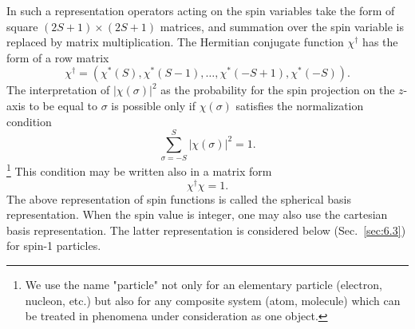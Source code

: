 In such a representation operators acting on the spin variables take the form of square $(2 S+1) \times(2 S+1)$ matrices, and summation over the spin variable is replaced by matrix multiplication. The Hermitian conjugate function $\chi^{\dagger}$ has the form of a row matrix
\begin{equation}
\chi^{\dagger}=\left(\chi^{*}(S), \chi^{*}(S-1), \ldots ,\chi^{*}(-S+1), \chi^{*}(-S)\right) . \label{eq:6:1:2}
\end{equation}
The interpretation of $|\chi(\sigma)|^{2}$ as the probability for the spin projection on the $z$-axis to be equal to $\sigma$ is possible only if $\chi(\sigma)$ satisfies the normalization condition
\begin{equation}
\sum_{\sigma=-S}^{S}|\chi(\sigma)|^{2}=1. \label{eq:6:1:3}
\end{equation}
\footnote{We use the name "particle" not only for an elementary particle (electron, nucleon, etc.) but also for any composite system (atom, molecule) which can be treated in phenomena under consideration as one object.}
This condition may be written also in a matrix form
\begin{equation}
\chi^{\dagger} \chi=1 . \label{eq:6:1:4}
\end{equation}
The above representation of spin functions is called the spherical basis representation. When the spin value is integer, one may also use the cartesian basis representation. The latter representation is considered below (Sec.~\ref{sec:6.3}) for spin-1 particles.


